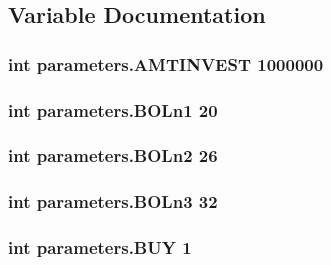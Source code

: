 \subsection{Variable Documentation}
\hypertarget{namespaceparameters_a935132dfc888d45f24341f8b7693fab6}{
\subsubsection[{A\-M\-T\-I\-N\-V\-E\-S\-T}]{\setlength{\rightskip}{0pt plus 5cm}int parameters.\-A\-M\-T\-I\-N\-V\-E\-S\-T 1000000}}\label{namespaceparameters_a935132dfc888d45f24341f8b7693fab6}
\hypertarget{namespaceparameters_ac254d46e0537bc175340808144c4d59e}{
\subsubsection[{B\-O\-Ln1}]{\setlength{\rightskip}{0pt plus 5cm}int parameters.\-B\-O\-Ln1 20}}\label{namespaceparameters_ac254d46e0537bc175340808144c4d59e}
\hypertarget{namespaceparameters_ac5726f7bc264f4fb281abdd88ba2ec9a}{
\subsubsection[{B\-O\-Ln2}]{\setlength{\rightskip}{0pt plus 5cm}int parameters.\-B\-O\-Ln2 26}}\label{namespaceparameters_ac5726f7bc264f4fb281abdd88ba2ec9a}
\hypertarget{namespaceparameters_a0da173cdefebb71b7c81c604197f2935}{
\subsubsection[{B\-O\-Ln3}]{\setlength{\rightskip}{0pt plus 5cm}int parameters.\-B\-O\-Ln3 32}}\label{namespaceparameters_a0da173cdefebb71b7c81c604197f2935}
\hypertarget{namespaceparameters_a78f29cfbf5e7e434a9f1f875dd21b5d8}{
\subsubsection[{B\-U\-Y}]{\setlength{\rightskip}{0pt plus 5cm}int parameters.\-B\-U\-Y 1}}\label{namespaceparameters_a78f29cfbf5e7e434a9f1f875dd21b5d8}
